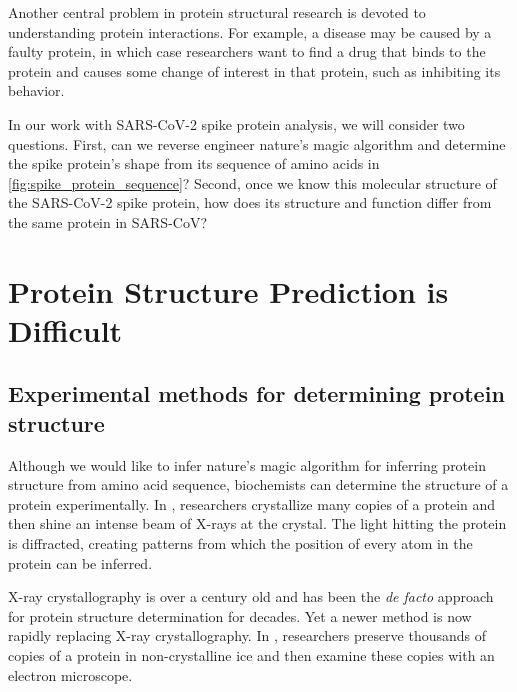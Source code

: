Another central problem in protein structural research is devoted to understanding protein interactions. For example, a disease may be caused by a faulty protein, in which case researchers want to find a drug that binds to the protein and causes some change of interest in that protein, such as inhibiting its behavior.

In our work with SARS-CoV-2 spike protein analysis, we will consider two questions. First, can we reverse engineer nature's magic algorithm and determine the spike protein's shape from its sequence of amino acids in \autoref{fig:spike_protein_sequence}? Second, once we know this molecular structure of the SARS-CoV-2 spike protein, how does its structure and function differ from the same protein in SARS-CoV?\\

\FloatBarrier
{}

\section{Protein Structure Prediction is Difficult}
\label{sec:structure_intro}

\subsection{Experimental methods for determining protein structure}

Although we would like to infer nature's magic algorithm for inferring protein structure from amino acid sequence, biochemists can determine the structure of a protein experimentally. In , researchers crystallize many copies of a protein and then shine an intense beam of X-rays at the crystal. The light hitting the protein is diffracted, creating patterns from which the position of every atom in the protein can be inferred.

X-ray crystallography is over a century old and has been the \textit{de facto} approach for protein structure determination for decades. Yet a newer method is now rapidly replacing X-ray crystallography. In , researchers preserve thousands of copies of a protein in non-crystalline ice and then examine these copies with an electron microscope.

